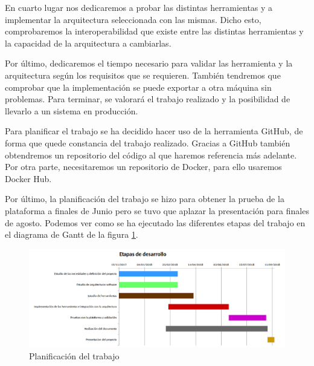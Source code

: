 En cuarto lugar nos dedicaremos a probar las distintas herramientas y a implementar la arquitectura seleccionada con las mismas. Dicho esto, comprobaremos la interoperabilidad que existe entre las distintas herramientas y la capacidad de la arquitectura a cambiarlas.\par


Por último, dedicaremos el tiempo necesario para validar las herramienta y la arquitectura según los requisitos que se requieren. También tendremos que comprobar que la implementación se puede exportar a otra máquina sin problemas. Para terminar, se valorará el trabajo realizado y la posibilidad de llevarlo a un sistema en producción.\par

Para planificar el trabajo se ha decidido hacer uso de la herramienta GitHub, de forma que quede constancia del trabajo realizado. Gracias a GitHub también obtendremos un repositorio del código al que haremos referencia más adelante. Por otra parte, necesitaremos un repositorio de Docker, para ello usaremos Docker Hub.\par
Por último, la planificación del trabajo se hizo para obtener la prueba de la plataforma a finales de Junio pero se tuvo que aplazar la presentación para finales de agosto. Podemos ver como se ha ejecutado las diferentes etapas del trabajo en el diagrama de Gantt de la figura \ref{etapas}.

\begin{figure}[htp]
\centering
\includegraphics[scale=0.57]{Imagenes/Etapasv2.png}
\caption{Planificación del trabajo}
\label{etapas}
\end{figure}



